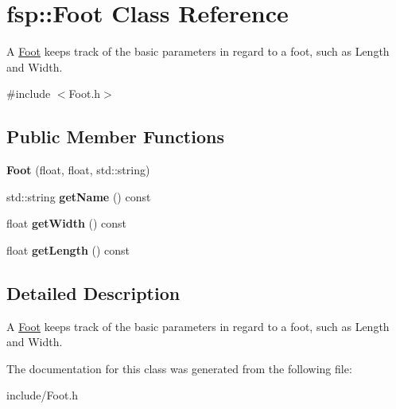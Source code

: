 \hypertarget{classfsp_1_1_foot}{\section{fsp\-:\-:Foot Class Reference}
\label{classfsp_1_1_foot}
}


A \hyperlink{classfsp_1_1_foot}{Foot} keeps track of the basic parameters in regard to a foot, such as Length and Width.  




{\ttfamily \#include $<$Foot.\-h$>$}

\subsection*{Public Member Functions}
\begin{DoxyCompactItemize}
\item 
\hypertarget{classfsp_1_1_foot_a90627cbfdc7640246fc34d5e016f4679}{{\bfseries Foot} (float, float, std\-::string)}\label{classfsp_1_1_foot_a90627cbfdc7640246fc34d5e016f4679}

\item 
\hypertarget{classfsp_1_1_foot_a80042faf971f460bbc381a03e1423a95}{std\-::string {\bfseries get\-Name} () const }\label{classfsp_1_1_foot_a80042faf971f460bbc381a03e1423a95}

\item 
\hypertarget{classfsp_1_1_foot_a92d2f29611a822d45d5e68b944b72393}{float {\bfseries get\-Width} () const }\label{classfsp_1_1_foot_a92d2f29611a822d45d5e68b944b72393}

\item 
\hypertarget{classfsp_1_1_foot_ab450ffad1fa5191acb49f368c87be928}{float {\bfseries get\-Length} () const }\label{classfsp_1_1_foot_ab450ffad1fa5191acb49f368c87be928}

\end{DoxyCompactItemize}


\subsection{Detailed Description}
A \hyperlink{classfsp_1_1_foot}{Foot} keeps track of the basic parameters in regard to a foot, such as Length and Width. 

The documentation for this class was generated from the following file\-:\begin{DoxyCompactItemize}
\item 
include/Foot.\-h\end{DoxyCompactItemize}
